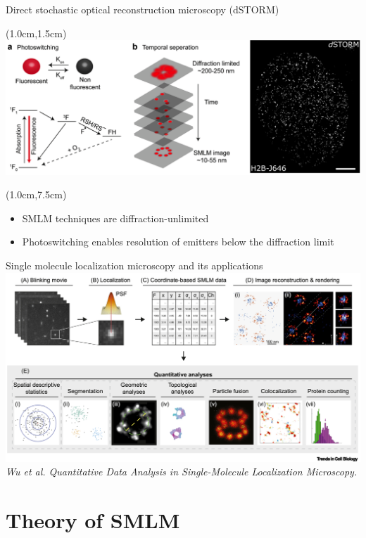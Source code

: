 \documentclass{beamer}					%
\begin{document}
\begin{frame}{Direct stochastic optical reconstruction microscopy (dSTORM)}
\begin{textblock*}{13cm}(1.0cm,1.5cm)
\includegraphics[width=\textwidth]{Intro.png}
\end{textblock*}
\begin{textblock*}{\textwidth}(1.0cm,7.5cm)
\begin{itemize}
\item SMLM techniques are diffraction-unlimited
\item Photoswitching enables resolution of emitters below the diffraction limit
\end{itemize}
\end{textblock*}
\end{frame}

\begin{frame}{Single molecule localization microscopy and its applications}
\includegraphics[width=\textwidth]{Apps}
\textit{Wu et al. Quantitative Data Analysis in Single-Molecule Localization Microscopy.}
\end{frame}

\section{Theory of SMLM} 
\end{document}
